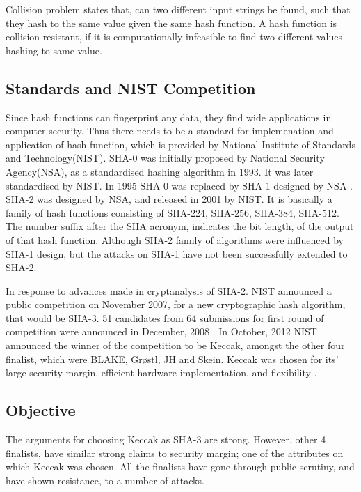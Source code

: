 \documentclass[12pt]{artikel3}                  %
\begin{document}
Collision problem states that, can two different input strings be found, such that they hash to the same
value given the same hash function. A hash function is collision resistant, if it is computationally
infeasible to find two different values hashing to same value.

\subsection{Standards and NIST Competition}

Since hash functions can fingerprint any data, they find wide applications in computer security. Thus there
needs to be a standard for implemenation and application of hash function, which is provided by National Institute
of Standards and Technology(NIST)\cite{00037}. SHA-0 was initially proposed by National Security Agency(NSA), as 
a standardised hashing algorithm in 1993. It was later standardised by NIST. In 1995 SHA-0 was replaced by SHA-1 
designed by NSA \cite{00006, 00007}. SHA-2 was designed by NSA, and released in 2001 by NIST. It is basically a 
family of hash functions consisting of SHA-224, SHA-256, SHA-384, SHA-512. The number suffix after the SHA acronym, 
indicates the bit length, of the output of that hash function. Although SHA-2 family of algorithms were influenced
by SHA-1 design, but the attacks on SHA-1 have not been successfully extended to SHA-2.

In response to advances made in cryptanalysis of SHA-2. NIST announced a public competition on November 2007,
for a new cryptographic hash algorithm, that would be SHA-3. 51 candidates from 64 submissions for first round 
of competition were announced in December, 2008 \cite{00039}. In October, 2012 NIST announced the winner of the 
competition to be Keccak, amongst the other four finalist, which were BLAKE, Gr{\o}stl, JH and Skein. Keccak 
was chosen for its' large security margin, efficient hardware implementation, and flexibility \cite{00040}.

\subsection{Objective}

The arguments for choosing Keccak as SHA-3 are strong. However, other 4 finalists, have similar strong claims 
to security margin; one of the attributes on which Keccak was chosen. All the finalists have gone through 
public scrutiny, and have shown resistance, to a number of attacks.
\end{document}
